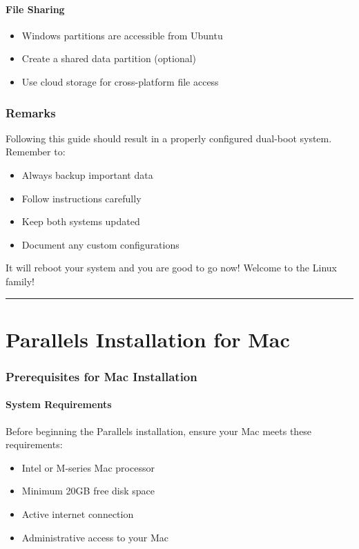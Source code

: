 \documentclass[11pt,a4paper]{article}
\begin{document}
\subsection{File Sharing}
\begin{itemize}
    \item Windows partitions are accessible from Ubuntu
    \item Create a shared data partition (optional)
    \item Use cloud storage for cross-platform file access
\end{itemize}

\section{Remarks}
Following this guide should result in a properly configured dual-boot system. Remember to:
\begin{itemize}
    \item Always backup important data
    \item Follow instructions carefully
    \item Keep both systems updated
    \item Document any custom configurations
\end{itemize}

It will reboot your system and you are good to go now! Welcome to the Linux family!

\noindent\rule{\textwidth}{1pt}

\newpage
\part{Parallels Installation for Mac}

\section{Prerequisites for Mac Installation}
\subsection{System Requirements}
Before beginning the Parallels installation, ensure your Mac meets these requirements:
\begin{itemize}
    \item Intel or M-series Mac processor
    \item Minimum 20GB free disk space
    \item Active internet connection
    \item Administrative access to your Mac
\end{itemize}
\end{document}
